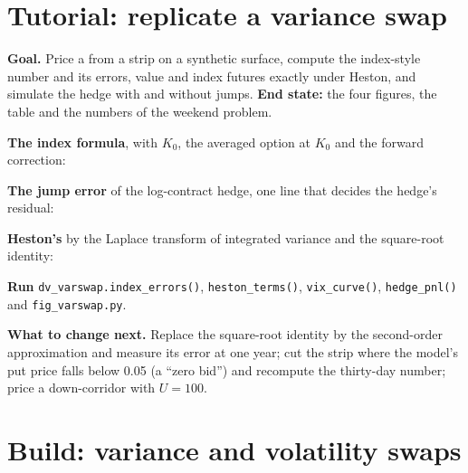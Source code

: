 \section{Tutorial: replicate a variance swap}\label{tut:dv:variance-swaps-and-volatility-derivatives:tut}

\begin{tutorial}
\textbf{Goal.} Price a  from a strip on a synthetic surface, compute the index-style number and its
errors, value  and index futures exactly under Heston, and simulate the hedge with and without
jumps. \textbf{End state:} the four figures, the table and the numbers of the weekend problem.
\begin{tutsteps}
\item \textbf{The index formula}, with $K_0$, the averaged option at $K_0$ and the forward correction:
\label{lst:dv:variance-swaps-and-volatility-derivatives:index}
\item \textbf{The jump error} of the log-contract hedge, one line that decides the hedge's residual:
\label{lst:dv:variance-swaps-and-volatility-derivatives:jump}
\item \textbf{Heston's } by the Laplace transform of integrated variance and the square-root
identity:
\label{lst:dv:variance-swaps-and-volatility-derivatives:volswap}
\item \textbf{Run} \texttt{dv\_varswap.index\_errors()}, \texttt{heston\_terms()}, \texttt{vix\_curve()},
\texttt{hedge\_pnl()} and \texttt{fig\_varswap.py}.
\end{tutsteps}
\textbf{What to change next.} Replace the square-root identity by the second-order approximation and measure its
error at one year; cut the strip where the model's put price falls below 0.05 (a ``zero bid'') and recompute the
thirty-day number; price a down-corridor  with $U=100$.
\end{tutorial}

\section{Build: variance and volatility swaps}\label{bld:dv:variance-swaps-and-volatility-derivatives:varswap}


